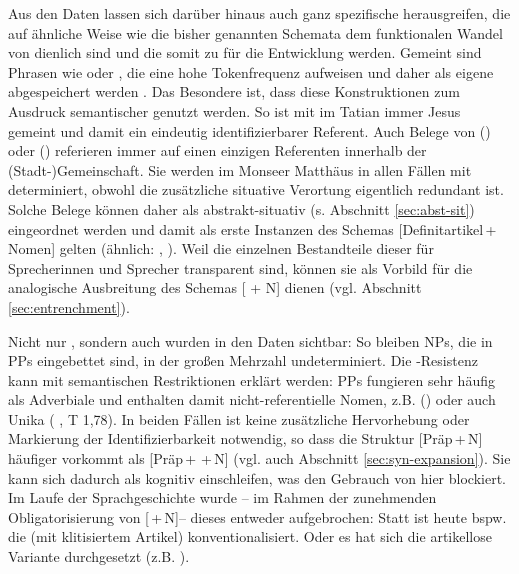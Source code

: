 Aus den Daten lassen sich darüber hinaus auch ganz spezifische  herausgreifen, die auf ähnliche Weise wie die bisher genannten Schemata dem funktionalen Wandel von  dienlich sind und die somit zu  für die Entwicklung werden. Gemeint sind Phrasen wie  oder , die eine hohe Tokenfrequenz aufweisen und daher als eigene abgespeichert werden  \parencite[= Token-Entrenchment, s.][]{Ziem2013}. Das Besondere ist, dass diese Konstruktionen zum Ausdruck semantischer   genutzt werden. So ist mit   im Tatian immer Jesus gemeint und damit ein eindeutig identifizierbarer Referent. Auch Belege von   () oder   () referieren immer auf einen einzigen Referenten innerhalb der (Stadt-)Gemeinschaft. Sie werden im Monseer Matthäus in allen Fällen mit  determiniert, obwohl die zusätzliche situative  Verortung eigentlich redundant ist. Solche Belege können daher als abstrakt-situativ  (s. Abschnitt \ref{sec:abst-sit}) eingeordnet werden und damit als erste Instanzen des Schemas  [Definitartikel\,+\,Nomen] gelten (ähnlich: , ). Weil die einzelnen Bestandteile dieser  für Sprecherinnen und Sprecher transparent sind, können sie als Vorbild für die analogische  Ausbreitung des Schemas [ + N] dienen (vgl. Abschnitt \ref{sec:entrenchment}). 

Nicht nur , sondern auch  wurden in den Daten sichtbar: So bleiben  NPs, die in PPs eingebettet sind, in der großen Mehrzahl undeterminiert. Die -Resistenz kann mit semantischen Restriktionen erklärt werden: PPs fungieren sehr häufig als Adverbiale  und enthalten damit nicht-referentielle Nomen, z.B.  () oder auch Unika  ( , T 1,78). In beiden Fällen ist keine zusätzliche Hervorhebung oder Markierung der Identifizierbarkeit notwendig, so dass die Struktur [Präp\,+\,N] häufiger vorkommt als [Präp\,+\,\,+\,N] (vgl. auch Abschnitt \ref{sec:syn-expansion}). Sie kann sich dadurch als  kognitiv einschleifen, was den Gebrauch von  hier blockiert. Im Laufe der Sprachgeschichte wurde -- im Rahmen der zunehmenden Obligatorisierung von [\,+\,N]-- dieses  entweder aufgebrochen: Statt  ist heute bspw. die   (mit klitisiertem Artikel) konventionalisiert. Oder es hat sich die artikellose Variante durchgesetzt (z.B. ).
